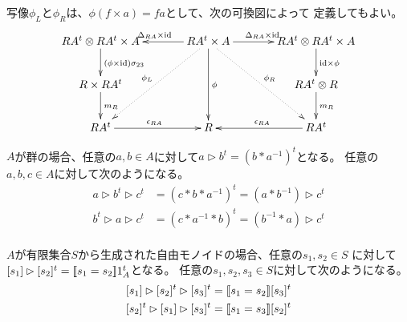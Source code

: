 	写像$\phi_L$と$\phi_R$は、$\phi(f\times a)=fa$として、次の可換図によって
	定義してもよい。
	\begin{equation}\xymatrix@C+1pc{
		RA^t\otimes RA^t\times A \ar[d]^{(\phi\times \myid)\sigma_{23}}
		& RA^t\times A \ar[l]_{\Delta_{RA}\times \myid} \ar[r]^{\Delta_{RA}\times \myid} \ar[dd]^{\phi} \ar@{.>}[ldd]_{\phi_L} \ar@{.>}[rdd]^{\phi_R}
		& RA^t\otimes RA^t\times A \ar[d]^{\myid\times \phi} \\
		R\times RA^t \ar[d]^{m_R}
		&
		& RA^t\otimes R \ar[d]^{m_R} \\
		RA^t \ar[r]^{\epsilon_{RA}}
		& R
		& RA^t \ar[l]_{\epsilon_{RA}}
	}\end{equation}

	\begin{example}[定義域が群の場合の積]\label{eg:定義域が群の場合の作用} %
		$A$が群の場合、任意の$a,b\in A$に対して$a\rhd b^t=(b*a^{-1})^t$となる。
		任意の$a,b,c\in A$に対して次のようになる。
		\begin{equation*}\begin{split} %
			a\rhd b^t\rhd c^t &= (c*b*a^{-1})^t = (a*b^{-1})\rhd c^t \\
			b^t\rhd a\rhd c^t &= (c*a^{-1}*b)^t = (b^{-1}*a)\rhd c^t \\
		\end{split}\end{equation*} %
	\end{example} %

	\begin{example}[定義域が自由モノイドの場合の積]\label{eg:定義域が自由モノイドの場合の積} %
		$A$が有限集合$S$から生成された自由モノイドの場合、任意の$s_1,s_2\in S$
		に対して$[s_1]\rhd[s_2]^t=[\![s_1=s_2]\!]1_A^t$となる。
		任意の$s_1,s_2,s_3\in S$に対して次のようになる。
		\begin{equation*}\begin{split} %
			[s_1]\rhd[s_2]^t\rhd [s_3]^t &= \jump{s_1=s_2}[s_3]^t \\
			[s_2]^t\rhd[s_1]\rhd [s_3]^t &= \jump{s_1=s_3}[s_2]^t \\
		\end{split}\end{equation*} %
	\end{example} %

